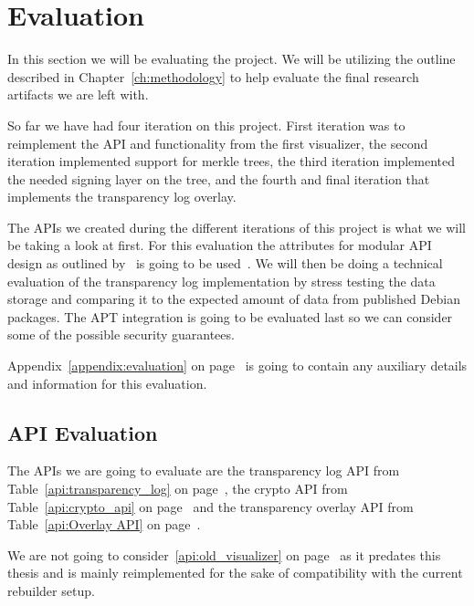 \documentclass[../Main/thesis.tex]{subfiles}
\begin{document}
\chapter{Evaluation}%
\label{ch:evaluation}
In this section we will be evaluating the project. We will be utilizing the
outline described in Chapter~\ref{ch:methodology} to help evaluate the final
research artifacts we are left with.

So far we have had four iteration on this project. First iteration was to
reimplement the API and functionality from the first visualizer, the second
iteration implemented support for merkle trees, the third iteration implemented
the needed signing layer on the tree, and the fourth and final iteration that
implements the transparency log overlay.

The APIs we created during the different iterations of this project is what we
will be taking a look at first. For this evaluation the attributes for modular
API design as outlined by~\citeauthor{Iyer:2012:EAC:2342209.2342213} is going to
be used~\cite{Iyer:2012:EAC:2342209.2342213}. We will then be doing a technical
evaluation of the transparency log implementation by stress testing the data
storage and comparing it to the expected amount of data from published Debian
packages. The APT integration is going to be evaluated last so we can consider
some of the possible security guarantees.

Appendix~\ref{appendix:evaluation} on page~\pageref{appendix:evaluation} is
going to contain any auxiliary details  and information for this evaluation.


\section{API Evaluation}%
\label{sec:api_evaluation}
The APIs we are going to evaluate are the transparency log API from
Table~\ref{api:transparency_log} on page~\pageref{api:transparency_log}, the
crypto API from Table~\ref{api:crypto_api} on page~\pageref{api:crypto_api} and
the transparency overlay API from Table~\ref{api:Overlay API} on
page~\pageref{api:Overlay API}.

We are not going to consider~\ref{api:old_visualizer} on
page~\pageref{api:old_visualizer} as it predates this thesis and is mainly
reimplemented for the sake of compatibility with the current rebuilder setup.
\end{document}
